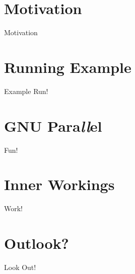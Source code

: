 


\section{Motivation}
\begin{frame}{Motivation}
\end{frame}
\section{Running Example}
\begin{frame}{Example Run!}
\end{frame}
\section{\texorpdfstring{GNU}{\textsc{gnu}} Para\textit{ll}\/el}
\begin{frame}{Fun!}

\end{frame}

\section{Inner Workings}
\begin{frame}{Work!}
\end{frame}

\section{Outlook?}
\begin{frame}{Look Out!}
\end{frame}

